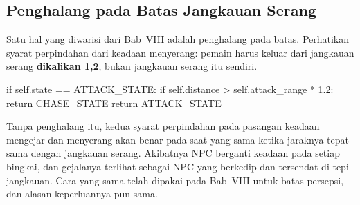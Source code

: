 \subsection{Penghalang pada Batas Jangkauan Serang}

Satu hal yang diwarisi dari Bab~VIII adalah penghalang pada batas. Perhatikan
syarat perpindahan dari keadaan menyerang: pemain harus keluar dari jangkauan
serang \textbf{dikalikan 1,2}, bukan jangkauan serang itu sendiri.

\begin{kodekeluaran}
if self.state == ATTACK_STATE:
    if self.distance > self.attack_range * 1.2:
        return CHASE_STATE
    return ATTACK_STATE
\end{kodekeluaran}

Tanpa penghalang itu, kedua syarat perpindahan pada pasangan keadaan mengejar
dan menyerang akan benar pada saat yang sama ketika jaraknya tepat sama dengan
jangkauan serang. Akibatnya NPC berganti keadaan pada setiap bingkai, dan
gejalanya terlihat sebagai NPC yang berkedip dan tersendat di tepi jangkauan.
Cara yang sama telah dipakai pada Bab~VIII untuk batas persepsi, dan alasan
keperluannya pun sama.
